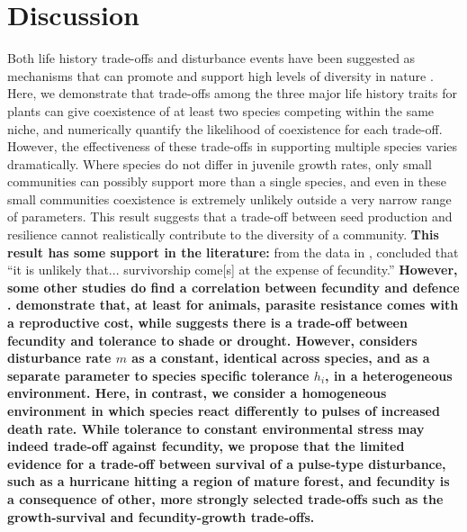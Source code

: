 \section{Discussion}
Both life history trade-offs and disturbance events have been suggested as mechanisms that can promote and support high levels of diversity in nature \citep[e.g.][]{adler2000space,denslow1987tropical,sousa1984role,turnbull1999seed}. Here, we demonstrate that trade-offs among the three major life history traits for plants can give coexistence of at least two species competing within the same niche, and numerically quantify the likelihood of coexistence for each trade-off. However, the effectiveness of these trade-offs in supporting multiple species varies dramatically. Where species do not differ in juvenile growth rates, only small communities can possibly support more than a single species, and even in these small communities coexistence is extremely unlikely outside a very narrow range of parameters. This result suggests that a trade-off between seed production and resilience cannot realistically contribute to the diversity of a community. \textbf{This result has some support in the literature:} from the data in \cite{martin2010dispersal}, \cite{martin2010divergence} concluded that ``it is unlikely that... survivorship come[s] at the expense of fecundity.'' \textbf{However, some other studies do find a correlation between fecundity and defence \citep[e.g.][]{marquis1984leaf,gwynn2005resistance}. \cite{gwynn2005resistance} demonstrate that, at least for animals, parasite resistance comes with a reproductive cost, while \cite{muller2010tolerance} suggests there is a trade-off between fecundity and tolerance to shade or drought. However, \cite{muller2010tolerance} considers disturbance rate $m$ as a constant, identical across species, and as a separate parameter to species specific tolerance $h_i$, in a heterogeneous environment. Here, in contrast, we consider a homogeneous environment in which species react differently to pulses of increased death rate. While tolerance to constant environmental stress may indeed trade-off against fecundity, we propose that the limited evidence for a trade-off between survival of a pulse-type disturbance, such as a hurricane hitting a region of mature forest, and fecundity is a consequence of other, more strongly selected trade-offs such as the growth-survival and fecundity-growth trade-offs.}

